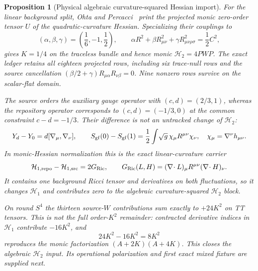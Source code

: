 \documentclass[11pt]{article}
\newtheorem{proposition}[theorem]{Proposition}
\theoremstyle{definition}
\theoremstyle{remark}
\begin{document}
\begin{proposition}[Physical algebraic curvature-squared Hessian import]
For the linear background split, Ohta and Percacci~\cite{OhtaPercacci}
print the projected monic zero-order tensor $U$ of the quadratic-curvature
Hessian.  Specializing their couplings to
\[
 (\alpha,\beta,\gamma)=\left(\frac16,-1,\frac12\right),
 \qquad
 \alpha R^2+\beta R_{\mu\nu}^2+\gamma R_{\mu\nu\rho\sigma}^2
 =\frac12 C^2,
\]
gives $K=1/4$ on the traceless bundle and hence monic
$\mathcal H_2=4PWP$.  The exact ledger retains all eighteen projected rows,
including six trace-null rows and the source cancellation
$(\beta/2+\gamma)R_{\mu\alpha}R_{\nu\beta}=0$.  Nine nonzero rows survive on
the scalar-flat domain.

The source orders the auxiliary gauge operator with
$(c,d)=(2/3,1)$, whereas the repository operator corresponds to
$(c,d)=(-1/3,0)$ at the common constraint $c-d=-1/3$.  Their difference is
not an untracked change of $\mathcal H_2$:
\[
 Y_d-Y_0=d[\nabla_\mu,\nabla_\nu],
 \qquad
 S_{\rm gf}(0)-S_{\rm gf}(1)
 =\frac12\int\!\sqrt g\,\chi_\mu R^{\mu\nu}\chi_\nu,
 \quad \chi_\mu=\nabla^\nu h_{\mu\nu}.
\]
In monic-Hessian normalization this is the exact linear-curvature carrier
\[
 \mathcal H_{1,\rm repo}-\mathcal H_{1,\rm src}=2G_{\rm Ric},
 \qquad
 G_{\rm Ric}(L,H)=(\nabla\!\cdot L)_\mu
 R^{\mu\nu}(\nabla\!\cdot H)_\nu .
\]
It contains one background Ricci tensor and derivatives on both
fluctuations, so it changes $\mathcal H_1$ and contributes zero to the
algebraic curvature-squared $\mathcal H_2$ block.

On round $S^4$ the thirteen source-$W$ contributions sum exactly to
$+24K^2$ on TT tensors.  This is not the full order-$K^2$ remainder:
contracted derivative indices in $\mathcal H_1$ contribute $-16K^2$, and
\[
 24K^2-16K^2=8K^2
\]
reproduces the monic factorization $(A+2K)(A+4K)$.  This closes the algebraic
$\mathcal H_2$ input.  Its operational polarization and first exact mixed
fixture are supplied next.
\end{proposition}
\end{document}
